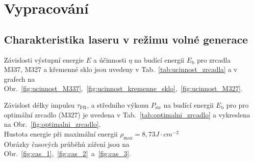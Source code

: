 			
\section{Vypracování}
\subsection{Charakteristika laseru v režimu volné generace}
Závislosti výstupní energie $E$ a účinnosti $\eta$ na budící energii $E_\mathrm{b}$ pro zrcadla M337, M327 a křemenné sklo jsou uvedeny v Tab.~\ref{tab:ucinnost_zrcadla} a v grafech na Obr.~\ref{fig:ucinnost_M337},~\ref{fig:ucinnost_kremenne_sklo},~\ref{fig:ucinnost_M327}.

Závislost délky impulsu $\tau_\mathrm{FR}$, a středního výkonu $P_\mathrm{str}$ na budící energii $E_\mathrm{b}$ pro pro optimální zrcadlo (M327) je uvedena v Tab.~\ref{tab:optimalni_zrcadlo} a vykreslena na Obr.~\ref{fig:optimalni_zrcadlo}.\\
Hustota energie při maximální energii $\rho_\mathrm{max}=8,73\unit{J\cdot cm^{-2}}$ \\
Obrázky časových průběhů záření jsou na Obr.~\ref{fig:cas_1},~\ref{fig:cas_2}~a~\ref{fig:cas_3}.

